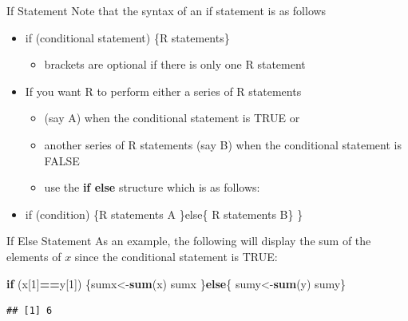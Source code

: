 \documentclass[
  ignorenonframetext,
]{beamer}
\newenvironment{Shaded}{\begin{snugshade}}{\end{snugshade}}
\newcommand{\ControlFlowTok}[1]{\textcolor[rgb]{0.13,0.29,0.53}{\textbf{#1}}}
\newcommand{\DecValTok}[1]{\textcolor[rgb]{0.00,0.00,0.81}{#1}}
\newcommand{\FunctionTok}[1]{\textcolor[rgb]{0.13,0.29,0.53}{\textbf{#1}}}
\newcommand{\NormalTok}[1]{#1}
\newcommand{\OtherTok}[1]{\textcolor[rgb]{0.56,0.35,0.01}{#1}}
\newcommand{\SpecialCharTok}[1]{\textcolor[rgb]{0.81,0.36,0.00}{\textbf{#1}}}
\providecommand{\tightlist}{%
  \setlength{\itemsep}{0pt}\setlength{\parskip}{0pt}}
\begin{document}
\begin{frame}{If Statement}
\protect\hypertarget{if-statement-1}{}
Note that the syntax of an if statement is as follows

\begin{itemize}
\item
  if (conditional statement) \{R statements\}

  \begin{itemize}
  \tightlist
  \item
    brackets are optional if there is only one R statement
  \end{itemize}
\item
  If you want R to perform either a series of R statements

  \begin{itemize}
  \tightlist
  \item
    (say A) when the conditional statement is TRUE or
  \item
    another series of R statements (say B) when the conditional
    statement is FALSE
  \item
    use the \textbf{if else} structure which is as follows:
  \end{itemize}
\item
  if (condition) \{R statements A \}else\{ R statements B\} \}
\end{itemize}
\end{frame}

\begin{frame}[fragile]{If Else Statement}
\protect\hypertarget{if-else-statement}{}
As an example, the following will display the sum of the elements of
\(x\) since the conditional statement is TRUE:

\small

\begin{Shaded}
\begin{Highlighting}[]
\ControlFlowTok{if}\NormalTok{ (x[}\DecValTok{1}\NormalTok{]}\SpecialCharTok{==}\NormalTok{y[}\DecValTok{1}\NormalTok{])}
\NormalTok{\{sumx}\OtherTok{\textless{}{-}}\FunctionTok{sum}\NormalTok{(x)}
\NormalTok{sumx}
\NormalTok{\}}\ControlFlowTok{else}\NormalTok{\{}
\NormalTok{  sumy}\OtherTok{\textless{}{-}}\FunctionTok{sum}\NormalTok{(y)}
\NormalTok{  sumy\}}
\end{Highlighting}
\end{Shaded}

\begin{verbatim}
## [1] 6
\end{verbatim}

\normalsize
\end{frame}
\end{document}
